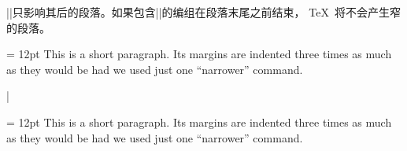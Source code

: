 %

|\narrower|只影响其后的段落。如果包含|\narrower|的编组在段落末尾之前结束，
\TeX\ 将不会产生窄的段落。

\example
{\parindent = 12pt \narrower\narrower\narrower
This is a short paragraph. Its margins are indented
three times as much as they would be
had we used just one ``narrower'' command.\par}
|
\produces
{\parindent = 12pt \narrower\narrower\narrower
This is a short paragraph. Its margins are indented
three times as much as they would be
had we used just one ``narrower'' command.\par}
\endexample\enddesc

